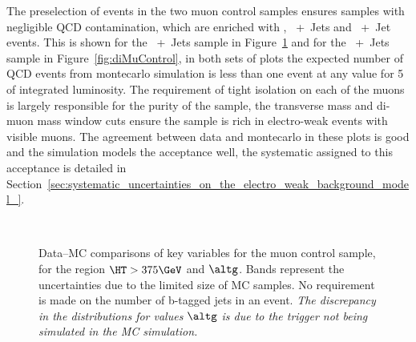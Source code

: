 The preselection of events in the two muon control samples ensures samples 
with negligible QCD contamination, which are enriched with 
\HepProcess{\Ptop\APtop}, \PW~+~Jets and \PZ~+~Jet events. This is shown for 
the \Pmu~+~Jets sample in Figure~\ref{fig:singleMuControl} and for the 
\HepProcess{\Pmu\Pmu}~+~Jets sample in Figure~\ref{fig:diMuControl}, in 
both sets of plots the expected number of QCD events from montecarlo simulation 
is less than one event at any \alt value for \unit{5}{\invfb} of integrated 
luminosity. The requirement of tight isolation on each of the muons is largely 
responsible for the purity of the sample, the transverse mass and di-muon mass 
window cuts ensure the sample is rich in electro-weak events with visible muons.
The agreement between data and montecarlo in these plots is good and the simulation models the \alt acceptance well, the systematic assigned to this acceptance is detailed in Section~\ref{sec:systematic_uncertainties_on_the_electro_weak_background_model_}.


\begin{figure}[|h]
  \centering
   \\
  \caption{Data--MC comparisons of key variables for the muon control
    sample, for the region $\HT > 375\GeV$ and $\altg$. Bands represent the uncertainties due to the limited size
    of MC samples. No requirement is made on the number of b-tagged
    jets in an event. {\it The discrepancy in the \alt
      distributions for values $\altg$ is due to the trigger
      not being simulated in the MC simulation.}}
      \label{fig:singleMuControl}
\end{figure}


